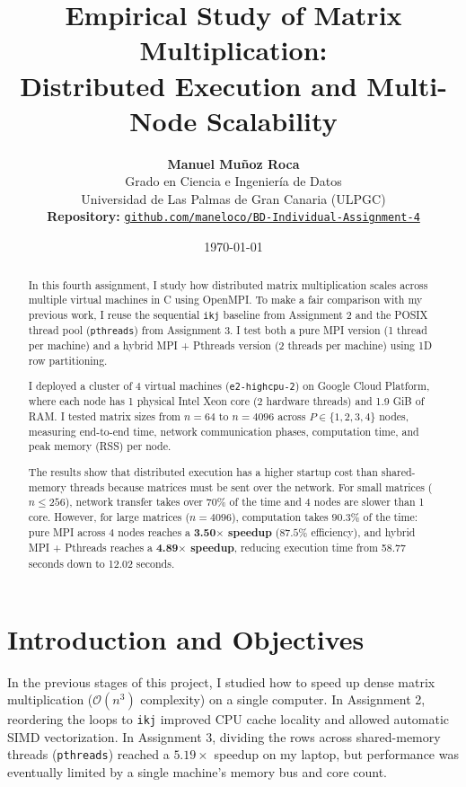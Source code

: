 \documentclass[11pt,a4paper]{article}
\title{\textbf{Empirical Study of Matrix Multiplication:\\Distributed Execution and Multi-Node Scalability}}
\author{\textbf{Manuel Muñoz Roca} \\
Grado en Ciencia e Ingeniería de Datos \\
Universidad de Las Palmas de Gran Canaria (ULPGC) \\
\vspace{0.15cm}
\small \textbf{Repository:} \href{https://github.com/maneloco/BD-Individual-Assignment-4}{\texttt{github.com/maneloco/BD-Individual-Assignment-4}}}
\date{\today}
\begin{document}
\maketitle

\begin{abstract}
In this fourth assignment, I study how distributed matrix multiplication scales across multiple virtual machines in C using OpenMPI. To make a fair comparison with my previous work, I reuse the sequential \texttt{ikj} baseline from Assignment 2 and the POSIX thread pool (\texttt{pthreads}) from Assignment 3. I test both a pure MPI version (1 thread per machine) and a hybrid MPI + Pthreads version (2 threads per machine) using 1D row partitioning.

I deployed a cluster of 4 virtual machines (\texttt{e2-highcpu-2}) on Google Cloud Platform, where each node has 1 physical Intel Xeon core (2 hardware threads) and 1.9 GiB of RAM. I tested matrix sizes from $n = 64$ to $n = 4096$ across $P \in \{1, 2, 3, 4\}$ nodes, measuring end-to-end time, network communication phases, computation time, and peak memory (RSS) per node.

The results show that distributed execution has a higher startup cost than shared-memory threads because matrices must be sent over the network. For small matrices ($n \le 256$), network transfer takes over $70\%$ of the time and 4 nodes are slower than 1 core. However, for large matrices ($n = 4096$), computation takes $90.3\%$ of the time: pure MPI across 4 nodes reaches a \textbf{3.50$\times$ speedup} ($87.5\%$ efficiency), and hybrid MPI + Pthreads reaches a \textbf{4.89$\times$ speedup}, reducing execution time from 58.77 seconds down to 12.02 seconds.
\end{abstract}

\section{Introduction and Objectives}

In the previous stages of this project, I studied how to speed up dense matrix multiplication ($\mathcal{O}(n^3)$ complexity) on a single computer. In Assignment 2, reordering the loops to \texttt{ikj} improved CPU cache locality and allowed automatic SIMD vectorization. In Assignment 3, dividing the rows across shared-memory threads (\texttt{pthreads}) reached a $5.19\times$ speedup on my laptop, but performance was eventually limited by a single machine's memory bus and core count.
\end{document}
